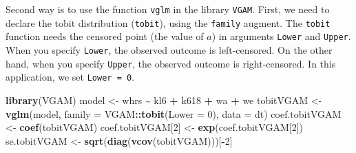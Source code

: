 \documentclass[
  12pt,
]{article}
\newenvironment{Shaded}{\begin{snugshade}}{\end{snugshade}}
\newcommand{\DataTypeTok}[1]{\textcolor[rgb]{0.13,0.29,0.53}{#1}}
\newcommand{\DecValTok}[1]{\textcolor[rgb]{0.00,0.00,0.81}{#1}}
\newcommand{\KeywordTok}[1]{\textcolor[rgb]{0.13,0.29,0.53}{\textbf{#1}}}
\newcommand{\NormalTok}[1]{#1}
\newcommand{\OperatorTok}[1]{\textcolor[rgb]{0.81,0.36,0.00}{\textbf{#1}}}
\newcommand{\OtherTok}[1]{\textcolor[rgb]{0.56,0.35,0.01}{#1}}
\newcommand{\StringTok}[1]{\textcolor[rgb]{0.31,0.60,0.02}{#1}}
\begin{document}
\begin{Shaded}
\end{Shaded}

Second way is to use the function \texttt{vglm} in the library
\texttt{VGAM}. First, we need to declare the tobit distribution
(\texttt{tobit}), using the \texttt{family} augment. The \texttt{tobit}
function needs the censored point (the value of \(a\)) in arguments
\texttt{Lower} and \texttt{Upper}. When you specify \texttt{Lower}, the
observed outcome is left-censored. On the other hand, when you specify
\texttt{Upper}, the observed outcome is right-censored. In this
application, we set \texttt{Lower\ =\ 0}.

\begin{Shaded}
\begin{Highlighting}[]
\KeywordTok{library}\NormalTok{(VGAM)}
\NormalTok{model \textless{}{-}}\StringTok{ }\NormalTok{whrs }\OperatorTok{\textasciitilde{}}\StringTok{ }\NormalTok{kl6 }\OperatorTok{+}\StringTok{ }\NormalTok{k618 }\OperatorTok{+}\StringTok{ }\NormalTok{wa }\OperatorTok{+}\StringTok{ }\NormalTok{we}
\NormalTok{tobitVGAM \textless{}{-}}\StringTok{ }\KeywordTok{vglm}\NormalTok{(model, }\DataTypeTok{family =}\NormalTok{ VGAM}\OperatorTok{::}\KeywordTok{tobit}\NormalTok{(}\DataTypeTok{Lower =} \DecValTok{0}\NormalTok{), }\DataTypeTok{data =}\NormalTok{ dt)}
\NormalTok{coef.tobitVGAM \textless{}{-}}\StringTok{ }\KeywordTok{coef}\NormalTok{(tobitVGAM)}
\NormalTok{coef.tobitVGAM[}\DecValTok{2}\NormalTok{] \textless{}{-}}\StringTok{ }\KeywordTok{exp}\NormalTok{(coef.tobitVGAM[}\DecValTok{2}\NormalTok{])}
\NormalTok{se.tobitVGAM \textless{}{-}}\StringTok{ }\KeywordTok{sqrt}\NormalTok{(}\KeywordTok{diag}\NormalTok{(}\KeywordTok{vcov}\NormalTok{(tobitVGAM)))[}\OperatorTok{{-}}\DecValTok{2}\NormalTok{]}
\end{Highlighting}
\end{Shaded}
\end{document}
